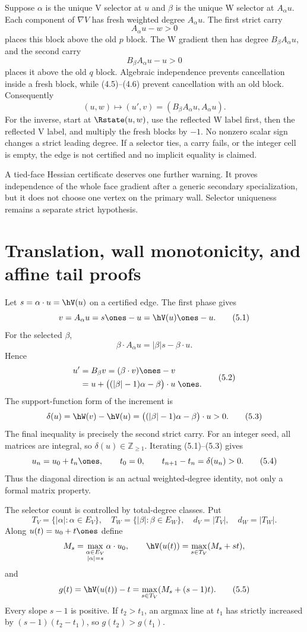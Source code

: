 \documentclass[11pt]{article}
\theoremstyle{definition}
\theoremstyle{remark}
\begin{document}
Suppose $\alpha$ is the unique V selector at $u$ and $\beta$ is the unique
W selector at $A_\alpha u$.  Each component of $\nabla V$ has fresh
weighted degree $A_\alpha u$.  The first strict carry
\[
 A_\alpha u-w>0
\tag{4.5}
\]
places this block above the old $p$ block.  The W gradient then has degree
$B_\beta A_\alpha u$, and the second carry
\[
 B_\beta A_\alpha u-u>0
\tag{4.6}
\]
places it above the old $q$ block.  Algebraic independence prevents
cancellation inside a fresh block, while (4.5)--(4.6) prevent cancellation
with an old block.  Consequently
\[
 (u,w)\longmapsto (u',v)=(B_\beta A_\alpha u,A_\alpha u).
\tag{4.7}
\]
For the inverse, start at $\Rstate(u,w)$, use the reflected W label first,
then the reflected V label, and multiply the fresh blocks by $-1$.  No
nonzero scalar sign changes a strict leading degree.  If a selector ties, a
carry fails, or the integer cell is empty, the edge is not certified and no
implicit equality is claimed.

A tied-face Hessian certificate deserves one further warning.  It proves
independence of the whole face gradient after a generic secondary
specialization, but it does not choose one vertex on the primary wall.
Selector uniqueness remains a separate strict hypothesis.

\section{Translation, wall monotonicity, and affine tail proofs}

Let $s=\alpha\cdot u=\hV(u)$ on a certified edge.  The first phase gives
\[
 v=A_\alpha u=s\ones-u=\hV(u)\ones-u.
\tag{5.1}
\]
For the selected $\beta$,
\[
 \beta\cdot A_\alpha u=|\beta|s-\beta\cdot u.
\]
Hence
\[
\begin{aligned}
 u'&=B_\beta v=(\beta\cdot v)\ones-v\\
 &=u+\bigl((|\beta|-1)\alpha-\beta\bigr)\cdot u\;\ones.
\end{aligned}
\tag{5.2}
\]
The support-function form of the increment is
\[
 \delta(u)=\hW(v)-\hV(u)
 =\bigl((|\beta|-1)\alpha-\beta\bigr)\cdot u>0.
\tag{5.3}
\]
The final inequality is precisely the second strict carry.  For an integer
seed, all matrices are integral, so $\delta(u)\in\mathbb Z_{\geq1}$.
Iterating (5.1)--(5.3) gives
\[
 u_n=u_0+t_n\ones,\qquad t_0=0,\qquad
 t_{n+1}-t_n=\delta(u_n)>0.
\tag{5.4}
\]
Thus the diagonal direction is an actual weighted-degree identity, not only
a formal matrix property.

The selector count is controlled by total-degree classes.  Put
\[
 T_V=\{|\alpha|:\alpha\in E_V\},\quad
 T_W=\{|\beta|:\beta\in E_W\},\quad
 d_V=|T_V|,\quad d_W=|T_W|.
\]
Along $u(t)=u_0+t\ones$ define
\[
 M_s=\max_{\substack{\alpha\in E_V\\|\alpha|=s}}\alpha\cdot u_0,
 \qquad
 \hV(u(t))=\max_{s\in T_V}(M_s+st),
\]
and
\[
 g(t)=\hV(u(t))-t=\max_{s\in T_V}(M_s+(s-1)t).
\tag{5.5}
\]
Every slope $s-1$ is positive.  If $t_2>t_1$, an argmax line at $t_1$
has strictly increased by $(s-1)(t_2-t_1)$, so $g(t_2)>g(t_1)$.
\end{document}
